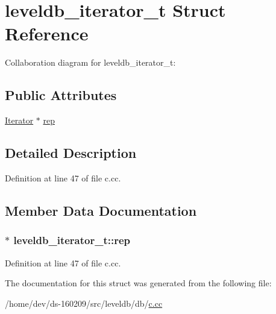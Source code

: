\hypertarget{structleveldb__iterator__t}{}\section{leveldb\+\_\+iterator\+\_\+t Struct Reference}
\label{structleveldb__iterator__t}


Collaboration diagram for leveldb\+\_\+iterator\+\_\+t\+:
\subsection*{Public Attributes}
\begin{DoxyCompactItemize}
\item 
\hyperlink{classleveldb_1_1_iterator}{Iterator} $\ast$ \hyperlink{structleveldb__iterator__t_a051a1df01c49d34f34628ae1467f9377}{rep}
\end{DoxyCompactItemize}


\subsection{Detailed Description}


Definition at line 47 of file c.\+cc.



\subsection{Member Data Documentation}
\hypertarget{structleveldb__iterator__t_a051a1df01c49d34f34628ae1467f9377}{}
\subsubsection[{rep}]{$\ast$ leveldb\+\_\+iterator\+\_\+t\+::rep}\label{structleveldb__iterator__t_a051a1df01c49d34f34628ae1467f9377}


Definition at line 47 of file c.\+cc.



The documentation for this struct was generated from the following file\+:\begin{DoxyCompactItemize}
\item 
/home/dev/ds-\/160209/src/leveldb/db/\hyperlink{c_8cc}{c.\+cc}\end{DoxyCompactItemize}
